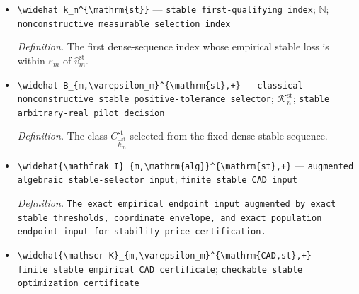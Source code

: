 \documentclass{article}
\begin{document}
\begin{itemize}
  \par\smallskip\noindent\emph{Definition.} The minimum of \(\widehat w_m^+(B)\) over \(\mathcal K_n^{\mathrm{st}}\).
  \item \texttt{\textbackslash{}\allowbreak{}widehat k\_\allowbreak{}m\textasciicircum{}\{\textbackslash{}\allowbreak{}mathrm\{st\}\allowbreak{}\}\allowbreak{}} --- \texttt{stable first-\allowbreak{}qualifying index}; \(\mathbb N\); \texttt{nonconstructive measurable selection index}
  \par\smallskip\noindent\emph{Definition.} The first dense-sequence index whose empirical stable loss is within \(\varepsilon_m\) of \(\widehat v_m^{\mathrm{st}}\).
  \item \texttt{\textbackslash{}\allowbreak{}widehat B\_\allowbreak{}\{m,\allowbreak{}\textbackslash{}\allowbreak{}varepsilon\_\allowbreak{}m\}\allowbreak{}\textasciicircum{}\{\textbackslash{}\allowbreak{}mathrm\{st\}\allowbreak{},\allowbreak{}+\allowbreak{}\}\allowbreak{}} --- \texttt{classical nonconstructive stable positive-\allowbreak{}tolerance selector}; \(\mathcal K_n^{\mathrm{st}}\); \texttt{stable arbitrary-\allowbreak{}real pilot decision}
  \par\smallskip\noindent\emph{Definition.} The class \(C_{\widehat k_m^{\mathrm{st}}}^{\mathrm{st}}\) selected from the fixed dense stable sequence.
  \item \texttt{\textbackslash{}\allowbreak{}widehat\{\textbackslash{}\allowbreak{}mathfrak I\}\allowbreak{}\_\allowbreak{}\{m,\allowbreak{}\textbackslash{}\allowbreak{}mathrm\{alg\}\allowbreak{}\}\allowbreak{}\textasciicircum{}\{\textbackslash{}\allowbreak{}mathrm\{st\}\allowbreak{},\allowbreak{}+\allowbreak{}\}\allowbreak{}} --- \texttt{augmented algebraic stable-\allowbreak{}selector input}; \texttt{finite stable CAD input}
  \par\smallskip\noindent\emph{Definition.} \texttt{The exact empirical endpoint input augmented by exact stable thresholds,\allowbreak{} coordinate envelope,\allowbreak{} and exact population endpoint input for stability-\allowbreak{}price certification.}
  \item \texttt{\textbackslash{}\allowbreak{}widehat\{\textbackslash{}\allowbreak{}mathscr K\}\allowbreak{}\_\allowbreak{}\{m,\allowbreak{}\textbackslash{}\allowbreak{}varepsilon\_\allowbreak{}m\}\allowbreak{}\textasciicircum{}\{\textbackslash{}\allowbreak{}mathrm\{CAD,\allowbreak{}st\}\allowbreak{},\allowbreak{}+\allowbreak{}\}\allowbreak{}} --- \texttt{finite stable empirical CAD certificate}; \texttt{checkable stable optimization certificate}

\end{itemize}
\end{document}
